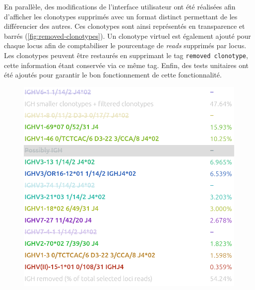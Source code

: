 En parallèle, des modifications de l'interface utilisateur ont été réalisées
afin d'afficher les clonotypes supprimés avec un format distinct permettant de
les différencier des autres. Ces clonotypes sont ainsi représentés en
transparence et barrés (\autoref{fig:removed-clonotypes}). Un clonotype virtuel
est également ajouté pour chaque locus afin de comptabiliser le pourcentage de
\textit{reads} supprimés par locus. Les clonotypes peuvent être restaurés en
supprimant le tag \texttt{removed clonotype}, cette information étant conservée
via ce même tag. Enfin, des tests unitaires ont été ajoutés pour garantir le
bon fonctionnement de cette fonctionnalité.

\begin{figure}[H]
    \begin{minipage}{0.65\textwidth}
        \centering
        \includegraphics[width=1\textwidth]{images/removed_clonotypes.png}
    \end{minipage}
    \hfill
    \begin{minipage}{0.3\textwidth}
        \centering

\end{minipage}
\end{figure}
